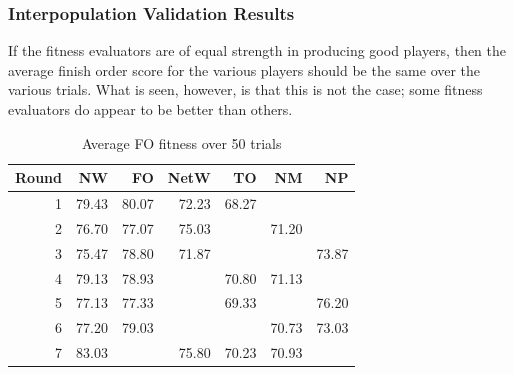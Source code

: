 \subsubsection{Interpopulation Validation Results}

If the fitness evaluators are of equal strength in producing good players, then
the average finish order score for the various players should be the same over
the various trials. What is seen, however, is that this is not the case; some
fitness evaluators do appear to be better than others.

\begin{table}[htbp]
  \centering
  \caption{Average FO fitness over 50 trials}
    \begin{tabular}{rrrrrrr}
    \toprule
    Round & NW    & FO    & NetW  & TO    & NM    & NP \\
    \midrule
    1     & \cellcolor{green!55!white}79.43 & \cellcolor{green!55!white}80.07 
          &                           72.23 &                           68.27 
          &                                 &    \\
    2     & \cellcolor{green!55!white}76.70 & \cellcolor{green!55!white}77.07 
          & \cellcolor{green!55!white}75.03 &                        
          &                           71.20 &    \\
    3     & \cellcolor{green!55!white}75.47 & \cellcolor{green!55!white}78.80 
          &                           71.87 & 
          &                                 &                           73.87 \\
    4     & \cellcolor{green!55!white}79.13 & \cellcolor{green!55!white}78.93 
          &                                 &                           70.80 
          &                           71.13 &    \\
    5     & \cellcolor{green!55!white}77.13 & \cellcolor{green!55!white}77.33 
          &                                 &                           69.33 
          &                                 & \cellcolor{green!55!white}76.20 \\
    6     & \cellcolor{green!55!white}77.20 & \cellcolor{green!55!white}79.03 
          &                                 & 
          &                           70.73 &                           73.03 \\
    7     & \cellcolor{green!55!white}83.03 & 
          & \cellcolor{green!55!white}75.80 &                           70.23 
          &                           70.93 &    \\

\end{tabular}
\end{table}
